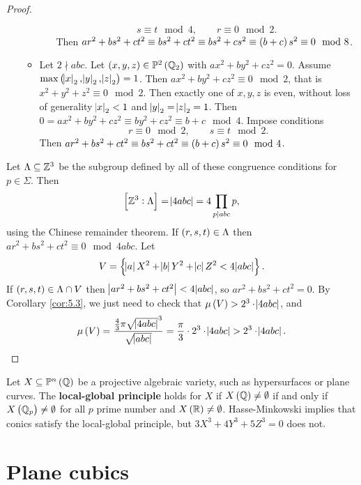 \begin{proof}
\begin{itemize}
\begin{itemize}
\begin{itemize}
$$ s \equiv t \mod 4, \qquad r \equiv 0 \mod 2. $$
Then $ ar^2 + bs^2 + ct^2 \equiv bs^2 + ct^2 \equiv bs^2 + cs^2 \equiv \br{b + c}s^2 \equiv 0 \mod 8 $.
\end{itemize}
\item Let $ 2 \nmid abc $. Let $ \br{x, y, z} \in \PP^2\br{\QQ_2} $ with $ ax^2 + by^2 + cz^2 = 0 $. Assume $ \max\br{\abs{x}_2, \abs{y}_2, \abs{z}_2} = 1 $. Then $ ax^2 + by^2 + cz^2 \equiv 0 \mod 2 $, that is $ x^2 + y^2 + z^2 \equiv 0 \mod 2 $. Then exactly one of $ x, y, z $ is even, without loss of generality $ \abs{x}_2 < 1 $ and $ \abs{y}_2 = \abs{z}_2 = 1 $. Then $ 0 = ax^2 + by^2 + cz^2 \equiv by^2 + cz^2 \equiv b + c \mod 4 $. Impose conditions
$$ r \equiv 0 \mod 2, \qquad s \equiv t \mod 2. $$
Then $ ar^2 + bs^2 + ct^2 \equiv bs^2 + ct^2 \equiv \br{b + c}s^2 \equiv 0 \mod 4 $.
\end{itemize}
\end{itemize}
Let $ \Lambda \subseteq \mathbb{Z}^3 $ be the subgroup defined by all of these congruence conditions for $ p \in \Sigma $. Then
$$ \sbr{\ZZ^3 : \Lambda} = \abs{4abc} = 4\prod_{p \mid abc} p, $$
using the Chinese remainder theorem. If $ \br{r, s, t} \in \Lambda $ then $ ar^2 + bs^2 + ct^2 \equiv 0 \mod 4abc $. Let
$$ V = \cbr{\abs{a}X^2 + \abs{b}Y^2 + \abs{c}Z^2 < 4\abs{abc}}. $$
If $ \br{r, s, t} \in \Lambda \cap V $ then $ \abs{ar^2 + bs^2 + ct^2} < 4\abs{abc} $, so $ ar^2 + bs^2 + ct^2 = 0 $. By Corollary \ref{cor:5.3}, we just need to check that $ \mu\br{V} > 2^3 \cdot \abs{4abc} $, and
$$ \mu\br{V} = \dfrac{\tfrac{4}{3}\pi\sqrt{\abs{4abc}}^3}{\sqrt{\abs{abc}}} = \dfrac{\pi}{3} \cdot 2^3 \cdot \abs{4abc} > 2^3 \cdot \abs{4abc}. $$
\end{proof}

\begin{remark}
Let $ X \subseteq \PP^n\br{\QQ} $ be a projective algebraic variety, such as hypersurfaces or plane curves. The \textbf{local-global principle} holds for $ X $ if $ X\br{\QQ} \ne \emptyset $ if and only if $ X\br{\QQ_p} \ne \emptyset $ for all $ p $ prime number and $ X\br{\RR} \ne \emptyset $. Hasse-Minkowski implies that conics satisfy the local-global principle, but $ 3X^3 + 4Y^3 + 5Z^3 = 0 $ does not.
\end{remark}

\pagebreak

\section{Plane cubics}

